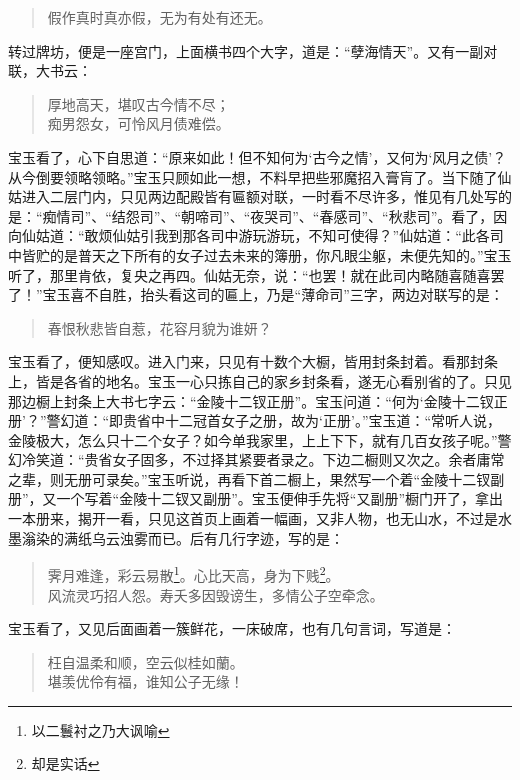 \documentclass[12pt,oneside]{book}
\newenvironment{shici}{%
\begin{verse}%
\centering\large\hspace{12pt}}%
{\end{verse}}
\begin{document}
\begin{shici}
假作真时真亦假，无为有处有还无。
\end{shici}


转过牌坊，便是一座宫门，上面横书四个大字，道是：“孽海情天”。又有一副对联，大书云：

\begin{shici}
厚地高天，堪叹古今情不尽；\\
痴男怨女，可怜风月债难偿。
\end{shici}


宝玉看了，心下自思道：“原来如此！但不知何为‘古今之情’，又何为‘风月之债’？从今倒要领略领略。”宝玉只顾如此一想，不料早把些邪魔招入膏肓了。当下随了仙姑进入二层门内，只见两边配殿皆有匾额对联，一时看不尽许多，惟见有几处写的是：“痴情司”、“结怨司”、“朝啼司”、“夜哭司”、“春感司”、“秋悲司”。看了，因向仙姑道：“敢烦仙姑引我到那各司中游玩游玩，不知可使得？”仙姑道：“此各司中皆贮的是普天之下所有的女子过去未来的簿册，你凡眼尘躯，未便先知的。”宝玉听了，那里肯依，复央之再四。仙姑无奈，说：“也罢！就在此司内略随喜随喜罢了！”宝玉喜不自胜，抬头看这司的匾上，乃是“薄命司”三字，两边对联写的是：

\begin{shici}
春恨秋悲皆自惹，花容月貌为谁妍？
\end{shici}


宝玉看了，便知感叹。进入门来，只见有十数个大橱，皆用封条封着。看那封条上，皆是各省的地名。宝玉一心只拣自己的家乡封条看，遂无心看别省的了。只见那边橱上封条上大书七字云：“金陵十二钗正册”。宝玉问道：“何为‘金陵十二钗正册’？”警幻道：“即贵省中十二冠首女子之册，故为‘正册’。”宝玉道：“常听人说，金陵极大，怎么只十二个女子？如今单我家里，上上下下，就有几百女孩子呢。”警幻冷笑道：“贵省女子固多，不过择其紧要者录之。下边二橱则又次之。余者庸常之辈，则无册可录矣。”宝玉听说，再看下首二橱上，果然写一个着“金陵十二钗副册”，又一个写着“金陵十二钗又副册”。宝玉便伸手先将“又副册”橱门开了，拿出一本册来，揭开一看，只见这首页上画着一幅画，又非人物，也无山水，不过是水墨滃染的满纸乌云浊雾而已。后有几行字迹，写的是：

\begin{shici}
霁月难逢，彩云易散\footnote{以二鬟衬之乃大讽喻}。心比天高，身为下贱\footnote{却是实话}。\\
风流灵巧招人怨。寿夭多因毁谤生，多情公子空牵念。
\end{shici}

宝玉看了，又见后面画着一簇鲜花，一床破席，也有几句言词，写道是：

\begin{shici}
枉自温柔和顺，空云似桂如蘭。\\
堪羡优伶有福，谁知公子无缘！
\end{shici}
\end{document}
